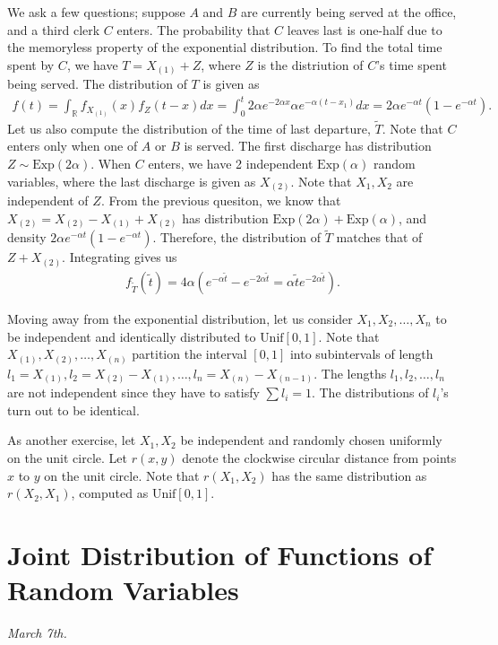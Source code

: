 \documentclass[15pt,a4paper]{book}
\theoremstyle{definition}
\newcommand{\R}{\mathbb{R}}
\begin{document}
We ask a few questions; suppose $A$ and $B$ are currently being served at the office, and a third clerk $C$ enters. The probability that $C$ leaves last is one-half due to the memoryless property of the exponential distribution. To find the total time spent by $C$, we have $T = X_{(1)} + Z$, where $Z$ is the distriution of $C$'s time spent being served. The distribution of $T$ is given as
\begin{align*}
    f(t) = \int_{\R} f_{X_{(1)}}(x)f_{Z}(t-x) dx = \int_{0}^{t} 2\alpha e^{-2\alpha x} \alpha e^{-\alpha (t-x_{1})} dx = 2\alpha e^{-\alpha t} (1-e^{-\alpha t}).
\end{align*}
Let us also compute the distribution of the time of last departure, $\tilde{T}$. Note that $C$ enters only when one of $A$ or $B$ is served. The first discharge has distribution $Z \sim \text{Exp}(2\alpha)$. When $C$ enters, we have 2 independent $\text{Exp}(\alpha)$ random variables, where the last discharge is given as $X_{(2)}$. Note that $X_{1},X_{2}$ are independent of $Z$. From the previous quesiton, we know that $X_{(2)} = X_{(2)} - X_{(1)} + X_{(2)}$ has distribution $\text{Exp}(2\alpha) + \text{Exp}(\alpha)$, and density $2 \alpha e^{-\alpha t} (1-e^{-\alpha t})$. Therefore, the distribution of $\tilde{T}$ matches that of $Z + X_{(2)}$. Integrating gives us
\begin{align}
    f_{\tilde{T}}(\tilde{t}) = 4\alpha (e^{-\alpha \tilde{t}} - e^{-2 \alpha \tilde{t}} = \alpha \tilde{t} e^{-2\alpha \tilde{t}}).
\end{align}

Moving away from the exponential distribution, let us consider $X_{1},X_{2},\ldots,X_{n}$ to be independent and identically distributed to $\text{Unif}[0,1]$. Note that $X_{(1)},X_{(2)},\ldots,X_{(n)}$ partition the interval $[0,1]$ into subintervals of length $l_{1} = X_{(1)}, l_{2} = X_{(2)}-X_{(1)},\ldots,l_{n}=X_{(n)}-X_{(n-1)}$. The lengths $l_{1},l_{2},\ldots,l_{n}$ are not independent since they have to satisfy $\sum l_{i} = 1$. The distributions of $l_{i}$'s turn out to be identical.

As another exercise, let $X_{1},X_{2}$ be independent and randomly chosen uniformly on the unit circle. Let $r(x,y)$ denote the clockwise circular distance from points $x$ to $y$ on the unit circle. Note that $r(X_{1},X_{2})$ has the same distribution as $r(X_{2},X_{1})$, computed as $\text{Unif}[0,1]$.

\section{Joint Distribution of Functions of Random Variables}
\textit{March 7th.}
\end{document}
